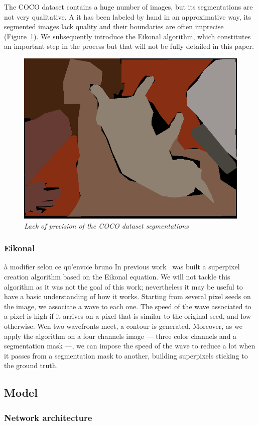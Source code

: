 \documentclass{article}
\begin{document}
            The COCO dataset contains a huge number of images, but its segmentations are not very qualitative. A it has been labeled by hand in an approximative way, its segmented images lack quality and their boundaries are often imprecise (Figure~\ref{fig:imprecise}). We subsequently introduce the Eikonal algorithm, which constitutes an important step in the process but that will not be fully detailed in this paper.

            \begin{figure}[!ht]
                \centering
                \includegraphics[width=0.3\linewidth]{pics/img_segm_coco.png}
                \caption{\textit{Lack of precision of the COCO dataset segmentations}}
                \label{fig:imprecise}
            \end{figure}


        \subsubsection{Eikonal}
            \cite{todo} à modifier selon ce qu'envoie bruno
            In previous work~\cite{figliuzzi2019} was built a superpixel creation algorithm based on the Eikonal equation. We will not tackle this algorithm as it was not the goal of this work; nevertheless it may be useful to have a basic understanding of how it works. Starting from several pixel seeds on the image, we associate a wave to each one. The speed of the wave associated to a pixel is high if it arrives on a pixel that is similar to the original seed, and low otherwise. Wen two wavefronts meet, a contour is generated. Moreover, as we apply the algorithm on a four channels image --- three color channels and a segmentation mask ---, we can impose the speed of the wave to reduce a lot when it passes from a segmentation mask to another, building superpixels sticking to the ground truth.



    \subsection{Model}

        \subsubsection{Network architecture}
\end{document}
